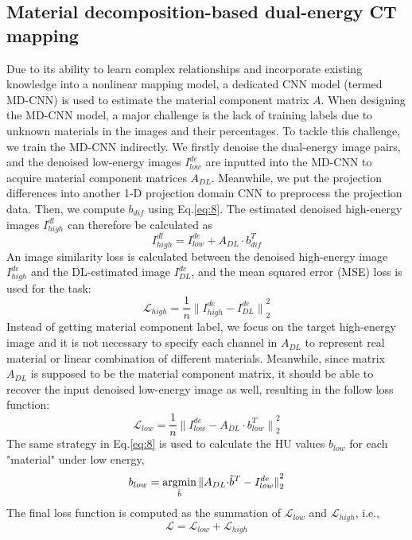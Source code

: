 \documentclass[journal,twoside,web]{ieeecolor}
\begin{document}
\subsection{Material decomposition-based dual-energy CT mapping}
Due to its ability to learn complex relationships and incorporate existing knowledge into a nonlinear mapping model, a dedicated CNN model (termed MD-CNN) is used to estimate the material component matrix \(A\). When designing the MD-CNN model, a major challenge is the lack of training labels due to unknown materials in the images and their percentages. To tackle this challenge, we train the MD-CNN indirectly. We firstly denoise the dual-energy image pairs, and the denoised low-energy images \(I_{low}^{de}\) are inputted into the MD-CNN to acquire material component matrices \(A_{DL}\). Meanwhile, we put the projection differences into another 1-D projection domain CNN to preprocess the projection data. Then, we compute \(b_{dif}\) using Eq.\eqref{eq:8}. The estimated denoised high-energy images \(I_{high}^{dl}\) can therefore be calculated as
\begin{equation}
    I_{high}^{dl}=I_{low}^{de} + A_{DL}{\cdot}b_{dif}^T
    \label{eq:10}
\end{equation}
An image similarity loss is calculated between the denoised high-energy image \(I_{high}^{de}\) and the DL-estimated image \(I_{DL}^{de}\), and the mean squared error (MSE) loss is used for the task:
\begin{equation}
    \mathcal{L}_{high}=\frac{1}{n}{\|I_{high}^{de}-I_{DL}^{de}\|}_2^2
    \label{eq:11}
\end{equation}
Instead of getting material component label, we focus on the target high-energy image and it is not necessary to specify each channel in \(A_{DL}\) to represent real material or linear combination of different materials. Meanwhile, since matrix \(A_{DL}\) is supposed to be the material component matrix, it should be able to recover the input denoised low-energy image as well, resulting in the follow loss function:
\begin{equation}
    \mathcal{L}_{low}=\frac{1}{n}{\|I_{low}^{de}-A_{DL}{\cdot}b_{low}^T\|}_2^2
    \label{eq:12}
\end{equation}
The same strategy in Eq.\eqref{eq:8} is used to calculate the HU values \(b_{low}\) for each "material" under low energy,
\begin{equation}
    b_{low}=\operatornamewithlimits{argmin}\limits_{\tilde{b}}{\|A_{DL}{\cdot}\tilde{b}^T-I_{low}^{de}\|}_2^2
    \label{eq:13}
\end{equation}
The final loss function is computed as the summation of \(\mathcal{L}_{low}\) and \(\mathcal{L}_{high}\), i.e.,
\begin{equation}
    \mathcal{L}=\mathcal{L}_{low}+\mathcal{L}_{high}
    \label{eq:14}
\end{equation}
\end{document}
